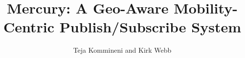 \documentclass[letterpaper,twocolumn,10pt]{article}
\title{Mercury: A Geo-Aware Mobility-Centric Publish/Subscribe System}
\author{Teja Kommineni and Kirk Webb}
\affil{School of Computing, University of Utah}
\begin{document}
\maketitle










{
  \small 
  
  
}
\end{document}
